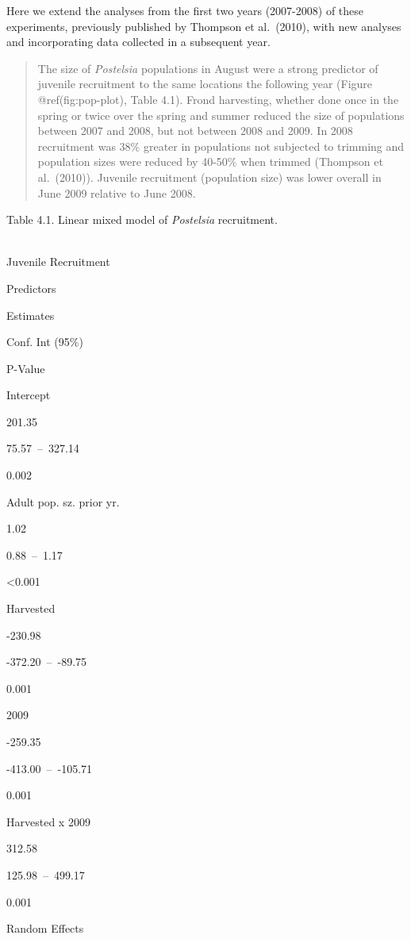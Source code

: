 \documentclass[
]{article}
\begin{document}
Here we extend the analyses from the first two years (2007-2008) of these experiments, previously published by Thompson et al.~(2010), with new analyses and incorporating data collected in a subsequent year.

\newpage

\begin{quote}
The size of \emph{Postelsia} populations in August were a strong predictor of juvenile recruitment to the same locations the following year (Figure @ref(fig:pop-plot), Table 4.1). Frond harvesting, whether done once in the spring or twice over the spring and summer reduced the size of populations between 2007 and 2008, but not between 2008 and 2009. In 2008 recruitment was 38\% greater in populations not subjected to trimming and population sizes were reduced by 40-50\% when trimmed (Thompson et al.~(2010)). Juvenile recruitment (population size) was lower overall in June 2009 relative to June 2008.
\end{quote}

Table 4.1. Linear mixed model of \emph{Postelsia} recruitment.\\

~

Juvenile Recruitment

Predictors

Estimates

Conf. Int (95\%)

P-Value

Intercept

201.35

75.57~--~327.14

0.002

Adult pop. sz. prior yr.

1.02

0.88~--~1.17

\textless0.001

Harvested

-230.98

-372.20~--~-89.75

0.001

2009

-259.35

-413.00~--~-105.71

0.001

Harvested x 2009

312.58

125.98~--~499.17

0.001

Random Effects
\end{document}
